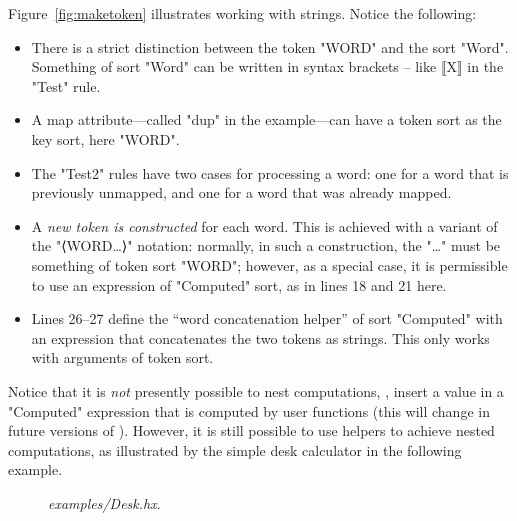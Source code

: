 \documentclass[11pt]{article} %
\begin{document}
\begin{example}
  Figure~\ref{fig:maketoken} illustrates working with strings. Notice the following:
  \begin{itemize}

  \item There is a strict distinction between the token "WORD" and the sort "Word". Something of
    sort "Word" can be written in syntax brackets -- like ⟦X⟧ in the "Test" rule.

  \item A map attribute---called "dup" in the example---can have a token sort as the key sort, here
    "WORD".

  \item The "Test2" rules have two cases for processing a word: one for a word that is previously
    unmapped, and one for a word that was already mapped.

  \item A \emph{new token is constructed} for each word. This is achieved with a variant of the
    "⟨WORD…⟩" notation: normally, in such a construction, the "…" must be something of token sort
    "WORD"; however, as a special case, it is permissible to use an expression of "Computed" sort,
    as in lines 18 and 21 here.

  \item Lines 26--27 define the ``word concatenation helper'' of sort "Computed" with an expression
    that concatenates the two tokens as strings. This only works with arguments of token sort.

  \end{itemize}
\end{example}

Notice that it is \emph{not} presently possible to nest computations, \ie, insert a value in a
"Computed" expression that is computed by user functions (this will change in future versions of
\HAX). However, it is still possible to use helpers to achieve nested computations, as illustrated
by the simple desk calculator in the following example.

\begin{figure}[p]
  \caption{\emph{examples/Desk.hx}.}
  \label{fig:desk}
\end{figure}

\end{document}
